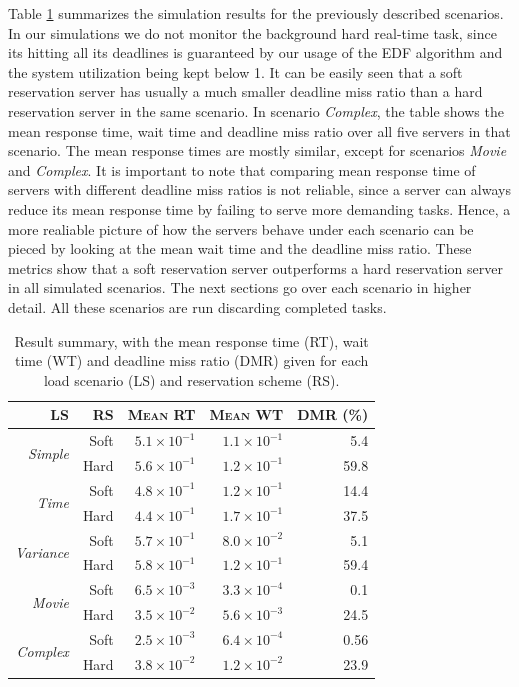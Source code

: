 \documentclass[12pt]{article}
\newcommand{\Lum}{\textit{Simple}}
\newcommand{\Ldois}{\textit{Time}}
\newcommand{\Ltres}{\textit{Variance}}
\newcommand{\Lquatro}{\textit{Movie}}
\newcommand{\Lcinco}{\textit{Complex}}
\begin{document}
Table \ref{tab:summary} summarizes the simulation results for the
previously described scenarios. In our simulations we do not monitor
the background hard real-time task, since its hitting all its
deadlines is guaranteed by our usage of the EDF algorithm and the
system utilization being kept below 1. It can be easily seen that a
soft reservation server has usually a much smaller deadline miss ratio
than a hard reservation server in the same scenario. In scenario \Lcinco{},
the table shows the mean response time, wait time and deadline miss
ratio over all five servers in that scenario. The mean response times
are mostly similar, except for scenarios \Lquatro{} and \Lcinco{}. It is important to
note that comparing mean response time of servers with different
deadline miss ratios is not reliable, since a server can always reduce
its mean response time by failing to serve more demanding
tasks. Hence, a more realiable picture of how the servers behave under
each scenario can be pieced by looking at the mean wait time and the
deadline miss ratio. These metrics show that a soft reservation server
outperforms a hard reservation server in all simulated scenarios. The
next sections go over each scenario in higher detail. All these
scenarios are run discarding completed tasks.

\begin{table}[ht]
  \centering
  \begin{tabular}[t]{rrrrr} \hline
    \textsc{LS} & \textsc{RS} & \textsc{Mean RT} & \textsc{Mean WT} & \textsc{DMR (\%)} \\ \hline
    \multirow{2}{*}{\Lum{}} & Soft & $5.1\times 10^{-1}$   & $1.1\times 10^{-1}$   & 5.4  \\
                        & Hard & $5.6\times 10^{-1}$   & $1.2\times 10^{-1}$   & 59.8 \\ \hline
    \multirow{2}{*}{\Ldois{}} & Soft & $4.8\times 10^{-1}$   & $1.2\times 10^{-1}$   & 14.4 \\
                        & Hard & $4.4\times 10^{-1}$   & $1.7\times 10^{-1}$   & 37.5 \\ \hline
    \multirow{2}{*}{\Ltres{}} & Soft & $5.7\times 10^{-1}$   & $8.0\times 10^{-2}$   & 5.1  \\
                        & Hard & $5.8\times 10^{-1}$   & $1.2\times 10^{-1}$   & 59.4 \\ \hline
    \multirow{2}{*}{\Lquatro{}} & Soft & $6.5\times 10^{-3}$   & $3.3\times 10^{-4}$   & 0.1  \\
                        & Hard & $3.5\times 10^{-2}$   & $5.6\times 10^{-3}$   & 24.5 \\ \hline    
    \multirow{2}{*}{\Lcinco{}} & Soft & $2.5\times 10^{-3}$   & $6.4\times 10^{-4}$   & 0.56  \\
                        & Hard & $3.8\times 10^{-2}$   & $1.2\times 10^{-2}$   & 23.9 \\ \hline    
  \end{tabular}
  \caption{Result summary, with the mean response time (RT), wait time
  (WT) and deadline miss ratio (DMR) given for each load scenario (LS)
  and reservation scheme (RS).}
  \label{tab:summary}
\end{table}
\end{document}
